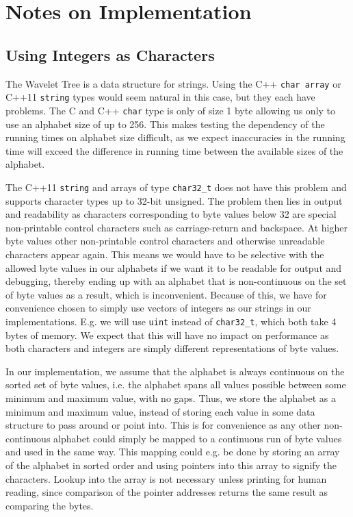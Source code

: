 \section{Notes on Implementation}

\subsection{Using Integers as Characters}
\label{sec:UsingIntAsChar}
The Wavelet Tree is a data structure for strings. 
Using the C++ \texttt{char array} or C++11 \texttt{string} types would seem natural in this case, but they each have problems.
The C and C++ \texttt{char} type is only of size 1 byte allowing us only to use an alphabet size of up to 256.
This makes testing the dependency of the running times on alphabet size difficult, as we expect inaccuracies in the running time will exceed the difference in running time between the available sizes of the alphabet.

The C++11 \texttt{string} and arrays of type \texttt{char32\_t} does not have this problem and supports character types up to 32-bit unsigned. 
The problem then lies in output and readability as characters corresponding to byte values below 32 are special non-printable control characters such as carriage-return and backspace. 
At higher byte values other non-printable control characters and otherwise unreadable characters appear again. This means we would have to be selective with the allowed byte values in our alphabets if we want it to be readable for output and debugging, thereby ending up with an alphabet that is non-continuous on the set of byte values as a result, which is inconvenient.
Because of this, we have for convenience chosen to simply use vectors of integers as our strings in our implementations.
E.g. we will use \texttt{uint} instead of \texttt{char32\_t}, which both take 4 bytes of memory.
We expect that this will have no impact on performance as both characters and integers are simply different representations of byte values.

In our implementation, we assume that the alphabet is always continuous on the sorted set of byte values, i.e. the alphabet spans all values possible between some minimum and maximum value, with no gaps.
Thus, we store the alphabet as a minimum and maximum value, instead of storing each value in some data structure to pass around or point into.
This is for convenience as any other non-continuous alphabet could simply be mapped to a continuous run of byte values and used in the same way. 
This mapping could e.g. be done by storing an array of the alphabet in sorted order and using pointers into this array to signify the characters. 
Lookup into the array is not necessary unless printing for human reading, since comparison of the pointer addresses returns the same result as comparing the bytes.

